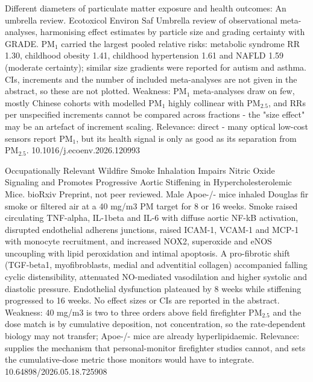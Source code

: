 \documentclass[10pt]{article}
\begin{document}
\par{}\baselineskip{}\baselineskip
{}

{Different diameters of particulate matter exposure and health outcomes: An umbrella review.}
{Ecotoxicol Environ Saf}
{Umbrella review of observational meta-analyses, harmonising effect estimates by particle size and grading certainty with GRADE. PM$_{1}$ carried the largest pooled relative risks: metabolic syndrome RR 1.30, childhood obesity 1.41, childhood hypertension 1.61 and NAFLD 1.59 (moderate certainty); similar size gradients were reported for autism and asthma. CIs, increments and the number of included meta-analyses are not given in the abstract, so these are not plotted. Weakness: PM$_{1}$ meta-analyses draw on few, mostly Chinese cohorts with modelled PM$_{1}$ highly collinear with PM$_{2.5}$, and RRs per unspecified increments cannot be compared across fractions - the "size effect" may be an artefact of increment scaling. Relevance: direct - many optical low-cost sensors report PM$_{1}$, but its health signal is only as good as its separation from PM$_{2.5}$.}
{10.1016/j.ecoenv.2026.120993}

{Occupationally Relevant Wildfire Smoke Inhalation Impairs Nitric Oxide Signaling and Promotes Progressive Aortic Stiffening in Hypercholesterolemic Mice.}
{bioRxiv}
{Preprint, not peer reviewed. Male Apoe-/- mice inhaled Douglas fir smoke or filtered air at a 40 mg/m3 PM target for 8 or 16 weeks. Smoke raised circulating TNF-alpha, IL-1beta and IL-6 with diffuse aortic NF-kB activation, disrupted endothelial adherens junctions, raised ICAM-1, VCAM-1 and MCP-1 with monocyte recruitment, and increased NOX2, superoxide and eNOS uncoupling with lipid peroxidation and intimal apoptosis. A pro-fibrotic shift (TGF-beta1, myofibroblasts, medial and adventitial collagen) accompanied falling cyclic distensibility, attenuated NO-mediated vasodilation and higher systolic and diastolic pressure. Endothelial dysfunction plateaued by 8 weeks while stiffening progressed to 16 weeks. No effect sizes or CIs are reported in the abstract. Weakness: 40 mg/m3 is two to three orders above field firefighter PM$_{2.5}$ and the dose match is by cumulative deposition, not concentration, so the rate-dependent biology may not transfer; Apoe-/- mice are already hyperlipidaemic. Relevance: supplies the mechanism that personal-monitor firefighter studies cannot, and sets the cumulative-dose metric those monitors would have to integrate.}
{10.64898/2026.05.18.725908}
\end{document}
